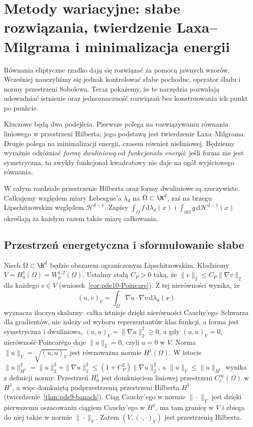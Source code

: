 \chapter[Metody wariacyjne i twierdzenie Laxa--Milgrama]{Metody wariacyjne: słabe rozwiązania, twierdzenie Laxa--Milgrama i minimalizacja energii}
\label{chap:pde-variational}

Równania eliptyczne rzadko dają się rozwiązać za pomocą jawnych wzorów.
Wcześniej nauczyliśmy się jednak kontrolować słabe pochodne,
operator śladu i normy przestrzeni Sobolewa. Teraz pokażemy, że
te narzędzia pozwalają udowadniać istnienie oraz jednoznaczność
rozwiązań bez konstruowania ich punkt po punkcie.

Kluczowe będą dwa podejścia. Pierwsze polega na rozwiązywaniu
równania liniowego w przestrzeni Hilberta; jego podstawą jest
twierdzenie Laxa--Milgrama. Drugie polega na minimalizacji energii,
czasem również nieliniowej. Będziemy wyraźnie odróżniać
\emph{formę dwuliniową} od \emph{funkcjonału energii}: jeśli forma nie
jest symetryczna, to zwykły funkcjonał kwadratowy nie daje
na ogół wyjściowego równania.

W całym rozdziale przestrzenie Hilberta oraz formy dwuliniowe są
rzeczywiste. Całkujemy względem miary Lebesgue'a
$\lambda_d$ na $\Omega\subset\R^d$, zaś na brzegu Lipschitzowskim
względem $\mathcal H^{d-1}$. Zapisy $\int_\Omega f\,\mathrm d\lambda_d(x)$
i $\int_{\partial\Omega}g\,\mathrm d\mathcal H^{d-1}(x)$
określają za każdym razem także miarę całkowania.

\section{Przestrzeń energetyczna i sformułowanie słabe}
\label{sec:pde11-weak}

Niech $\Omega\subset\R^d$ będzie obszarem ograniczonym Lipschitzowskim. Kładziemy $V=H_0^1(\Omega)=W_0^{1,2}(\Omega)$.
Ustalmy stałą $C_P>0$ taką, że
$\|v\|_2\le C_P\|\nabla v\|_2$ dla każdego $v\in V$
(wniosek~\ref{cor:pde10-Poincare}). Z tej nierówności wynika, że
\[ (u,v)_V=\int_\Omega\nabla u\cdot\nabla v\,\mathrm d\lambda_d(x) \]
wyznacza iloczyn skalarny: całka istnieje dzięki
nierówności Cauchy'ego--Schwarza dla gradientów,
nie zależy od wyboru reprezentantów klas funkcji,
a forma jest symetryczna i dwuliniowa,
$(u,u)_V=\|\nabla u\|_2^2\ge0$, a gdy $(u,u)_V=0$,
nierówność Poincarégo daje $\|u\|_2=0$, czyli $u=0$ w $V$.
Norma $\|u\|_V=\sqrt{(u,u)_V}$ jest równoważna normie
$H^1(\Omega)$. W istocie $\|u\|_{H^1}^2=\|u\|_2^2+
\|\nabla u\|_2^2\le(1+C_P^2)\|\nabla u\|_2^2$,
a $\|u\|_V\le\|u\|_{H^1}$ wynika z definicji normy.
Przestrzeń $H_0^1$ jest domknięciem liniowej przestrzeni
$C_c^\infty(\Omega)$ w $H^1$, a więc domkniętą podprzestrzenią
przestrzeni Hilberta $H^1$ (twierdzenie~\ref{thm:pde9-banach}).
Ciąg Cauchy'ego w normie $\|\cdot\|_V$ jest dzięki pierwszemu
oszacowaniu ciągiem Cauchy'ego w $H^1$, ma tam granicę w $V$
i zbiega do niej także w normie $\|\cdot\|_V$.
Zatem $(V,(\cdot,\cdot)_V)$ jest przestrzenią Hilberta.

